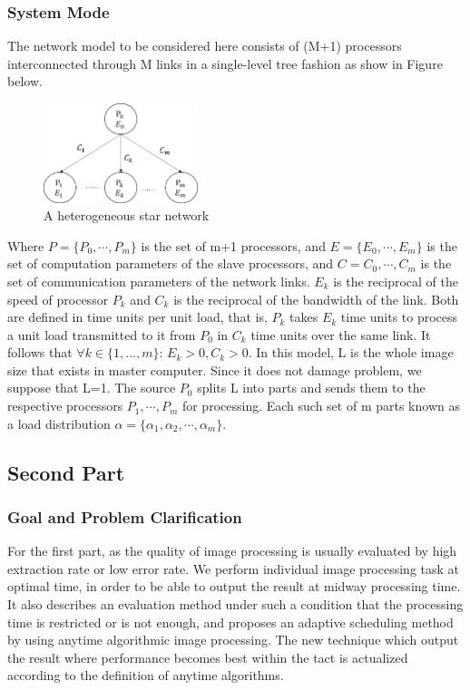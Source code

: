 \documentclass[twocolumn]{article}
\begin{document}
\subsubsection{System Mode}
The network model to be considered here consists of (M+1) processors interconnected through M links in a single-level tree fashion as show in Figure below.

\begin{figure}[H]
\centering
  \includegraphics[width=0.4\textwidth]{csn1.png}
\caption{A heterogeneous star network}
\end{figure}

Where $P=\{P_0,⋯,P_m\}$ is the set of m+1 processors, and $E=\{E_0,⋯,E_m\}$ is the set of computation parameters of the slave processors, and $C={C_0,⋯,C_m}$ is the set of communication parameters of the network links. $E_k$ is the reciprocal of the speed of processor $P_k$ and $C_k$ is the reciprocal of the bandwidth of the link. Both are defined in time units per unit load, that is, $P_k$ takes $E_k$ time units to process a unit load transmitted to it from $P_0$ in $C_k$ time units over the same link. It follows that $\forall k \in\{1,...,m\}$: $E_k > 0, C_k > 0$. In this model, L is the whole image size that exists in master computer. Since it does not damage problem, we suppose that L=1. The source $P_0$ splits L into parts and sends them to the respective processors $P_1,⋯,P_m$ for processing. Each such set of m parts known as a load distribution $\alpha=\{\alpha_1,\alpha_2,⋯,\alpha_m\}$.

\subsection{Second Part}
\subsubsection{Goal and Problem Clarification}
For the first part, as the quality of image processing is usually evaluated by high extraction rate or low error rate. We perform individual image processing task at optimal time, in order to be able to output the result at midway processing time.  It also describes an evaluation method under such a condition that the processing time is restricted or is not enough, and proposes an adaptive scheduling method by using anytime algorithmic image processing. The new technique which output the result where performance becomes best within the tact is actualized according to the definition of anytime algorithms. 
\end{document}
